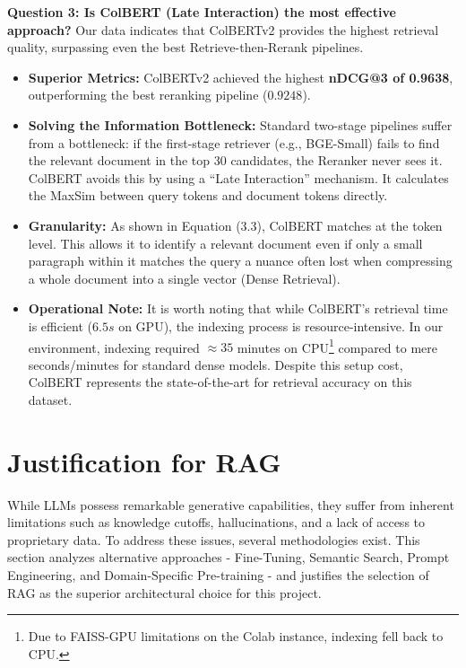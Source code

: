 \textbf{Question 3: Is ColBERT (Late Interaction) the most effective approach?}
Our data indicates that ColBERTv2 provides the highest retrieval quality, surpassing even the best Retrieve-then-Rerank pipelines.

\begin{itemize}
    \item \textbf{Superior Metrics:} ColBERTv2 achieved the highest \textbf{nDCG@3 of 0.9638}, outperforming the best reranking pipeline ($0.9248$).
    \item \textbf{Solving the Information Bottleneck:} Standard two-stage pipelines suffer from a bottleneck: if the first-stage retriever (e.g., BGE-Small) fails to find the relevant document in the top 30 candidates, the Reranker never sees it. ColBERT avoids this by using a ``Late Interaction'' mechanism. It calculates the MaxSim between query tokens and document tokens directly.
    \item \textbf{Granularity:} As shown in Equation (3.3), ColBERT matches at the token level. This allows it to identify a relevant document even if only a small paragraph within it matches the query a nuance often lost when compressing a whole document into a single vector (Dense Retrieval).
    \item \textbf{Operational Note:} It is worth noting that while ColBERT's retrieval time is efficient ($6.5s$ on GPU), the indexing process is resource-intensive. In our environment, indexing required $\approx35$ minutes on CPU\footnote{Due to FAISS-GPU limitations on the Colab instance, indexing fell back to CPU.} compared to mere seconds/minutes for standard dense models. Despite this setup cost, ColBERT represents the state-of-the-art for retrieval accuracy on this dataset.
\end{itemize}

\section{Justification for RAG}

While LLMs possess remarkable generative capabilities, they suffer from inherent limitations such as knowledge cutoffs, hallucinations, and a lack of access to proprietary data. To address these issues, several methodologies exist. This section analyzes alternative approaches - Fine-Tuning, Semantic Search, Prompt Engineering, and Domain-Specific Pre-training - and justifies the selection of RAG as the superior architectural choice for this project.

